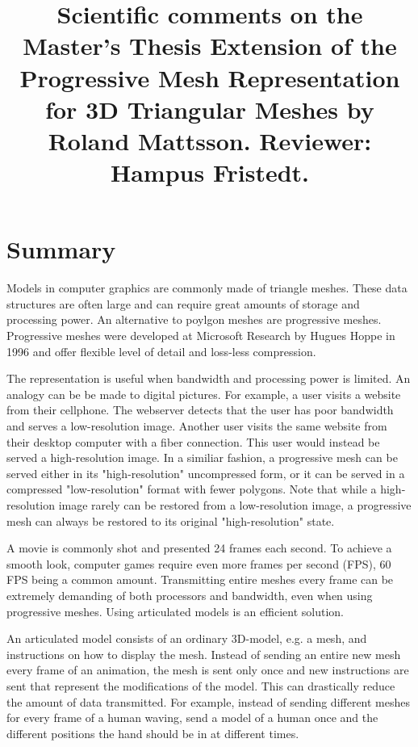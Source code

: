 \documentclass{article}
\title{Scientific comments on the Master's Thesis Extension of the Progressive Mesh Representation for 3D Triangular Meshes by Roland Mattsson. Reviewer:
Hampus Fristedt.}
\begin{document}
\maketitle

\newpage

\section{Summary}

Models in computer graphics are commonly made of triangle meshes. These data
structures are often large and can require great amounts of storage and
processing power. An alternative to poylgon meshes are progressive meshes.
Progressive meshes were developed at Microsoft Research by Hugues Hoppe in 1996
and offer flexible level of detail and loss-less compression. 

The representation is useful when bandwidth and processing power is limited. An
analogy can be be made to digital pictures. For example, a user visits a website
from their cellphone. The webserver detects that the user has poor bandwidth and
serves a low-resolution image. Another user visits the same website from their
desktop computer with a fiber connection. This user would instead be served a
high-resolution image. In a similiar fashion, a progressive mesh can be served
either in its "high-resolution" uncompressed form, or it can be served in a
compressed "low-resolution" format with fewer polygons. Note that while a
high-resolution image rarely can be restored from a low-resolution image, a
progressive mesh can always be restored to its original "high-resolution" state.

A movie is commonly shot and presented 24 frames each second. To achieve a
smooth look, computer games require even more frames per second (FPS), 60 FPS
being a common amount. Transmitting entire meshes every frame can be extremely
demanding of both processors and bandwidth, even when using progressive meshes.
Using articulated models is an efficient solution.

An articulated model consists of an ordinary 3D-model, e.g. a mesh, and
instructions on how to display the mesh. Instead of sending an entire new mesh
every frame of an animation, the mesh is sent only once and new instructions are
sent that represent the modifications of the model. This can drastically reduce
the amount of data transmitted. For example, instead of sending different meshes
for every frame of a human waving, send a model of a human once and the
different positions the hand should be in at different times.
\end{document}
